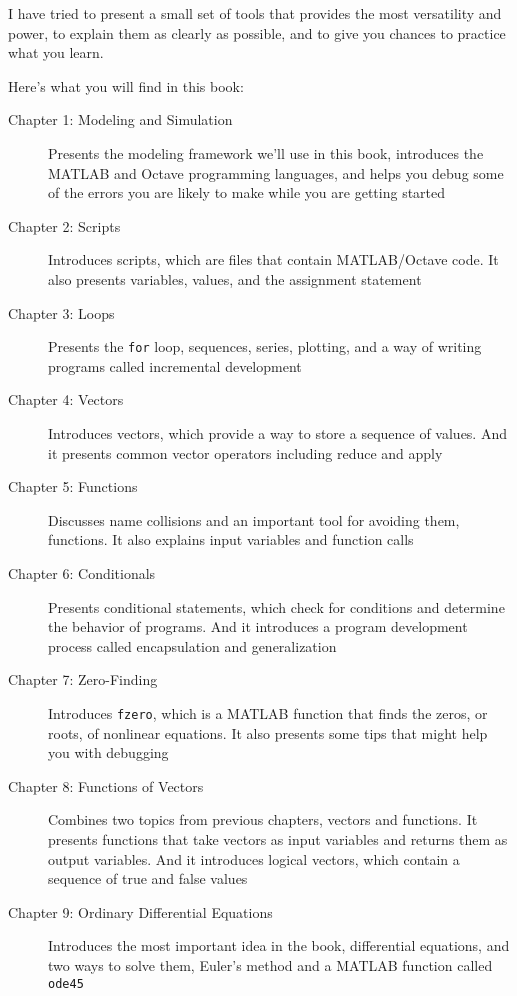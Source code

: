 I have tried to present a small set of tools that provides the most versatility and power, to explain them as clearly as possible, and to give you chances to practice what you learn.

Here's what you will find in this book:
\begin{description}
\item [Chapter 1: Modeling and Simulation] Presents the modeling framework we'll use in this book, introduces the MATLAB and Octave programming languages, and helps you debug some of the errors you are likely to make while you are getting started

\item [Chapter 2: Scripts] Introduces scripts, which are files that contain MATLAB/Octave code.  It also presents variables, values, and the assignment statement

\item [Chapter 3: Loops] Presents the \lstinline{for} loop, sequences, series, plotting, and a way of writing programs called incremental development

\item [Chapter 4: Vectors] Introduces vectors, which provide a way to store a sequence of values.  And it presents common vector operators including reduce and apply

\item [Chapter 5: Functions] Discusses name collisions and an important tool for avoiding them, functions.  It also explains input variables and function calls

\item [Chapter 6: Conditionals] Presents conditional statements, which check for conditions and determine the behavior of programs.  And it introduces a program development process called encapsulation and generalization

\item [Chapter 7: Zero-Finding] Introduces \lstinline{fzero}, which is a MATLAB function that finds the zeros, or roots, of nonlinear equations.  It also presents some tips that might help you with debugging

\item [Chapter 8: Functions of Vectors] Combines two topics from previous chapters, vectors and functions.  It presents functions that take vectors as input variables and returns them as output variables.  And it introduces logical vectors, which contain a sequence of true and false values

\item [Chapter 9: Ordinary Differential Equations] Introduces the most important idea in the book, differential equations, and two ways to solve them, Euler's method and a MATLAB function called \lstinline{ode45}


\end{description}
